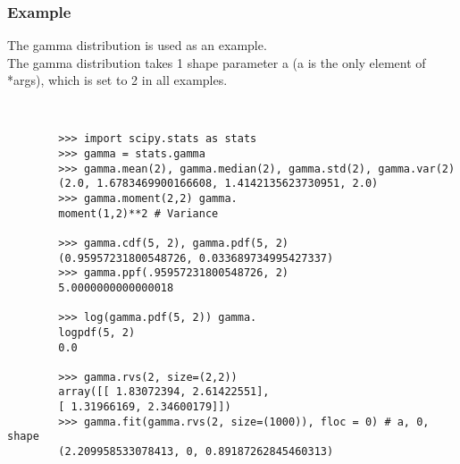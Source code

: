 \documentclass[Pydata.tex]{subfiles}
\begin{document}
\subsubsection{Example}
The gamma distribution is used as an example. \\ The gamma distribution takes 1 shape parameter a (a is
the only element of *args), which is set to 2 in all examples.
\begin{framed}
	\begin{verbatim}
		
		
		>>> import scipy.stats as stats
		>>> gamma = stats.gamma
		>>> gamma.mean(2), gamma.median(2), gamma.std(2), gamma.var(2)
		(2.0, 1.6783469900166608, 1.4142135623730951, 2.0)
		>>> gamma.moment(2,2) gamma.
		moment(1,2)**2 # Variance

		>>> gamma.cdf(5, 2), gamma.pdf(5, 2)
		(0.95957231800548726, 0.033689734995427337)
		>>> gamma.ppf(.95957231800548726, 2)
		5.0000000000000018

		>>> log(gamma.pdf(5, 2)) gamma.
		logpdf(5, 2)
		0.0

		>>> gamma.rvs(2, size=(2,2))
		array([[ 1.83072394, 2.61422551],
		[ 1.31966169, 2.34600179]])
		>>> gamma.fit(gamma.rvs(2, size=(1000)), floc = 0) # a, 0, shape
		(2.209958533078413, 0, 0.89187262845460313)
	\end{verbatim}
\end{framed}
\end{document}
